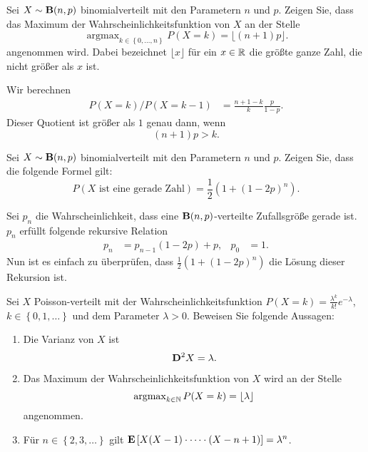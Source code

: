 Sei $X \sim \mathbf B(n,p)$ binomialverteilt mit den Parametern $n$ und $p$. Zeigen
Sie, dass das Maximum der Wahrscheinlichkeitsfunktion von $X$ an der Stelle
\begin{equation*}
    \operatorname{argmax}_{k\in \left\{ 0,\dots ,n \right\}} P(X=k) = \lfloor (n+1)p \rfloor.
\end{equation*}
angenommen wird. Dabei bezeichnet $\lfloor x \rfloor$ für ein $x\in\mathbb R$ die
größte ganze Zahl, die nicht größer als $x$ ist. 

\solution 
Wir berechnen
\begin{align*}
    P(X=k)/P(X=k-1) &= \frac{n+1-k}{k} \frac{p}{1-p}.
\end{align*}
Dieser Quotient ist größer als $1$ genau dann, wenn 
\begin{equation*}
    (n+1)p > k. 
\end{equation*}


Sei $X \sim \mathbf B(n,p)$ binomialverteilt mit den Parametern $n$ und $p$. Zeigen
Sie, dass die folgende Formel gilt:
\begin{equation*}
    P\left( X \text{ ist eine gerade Zahl} \right) = \frac{1}{2}\left( 1 + (1-2p)^n \right). 
\end{equation*}

\solution 
Sei $p_n$ die Wahrscheinlichkeit, dass eine
$\mathbf B(n,p)$-verteilte Zufallsgröße gerade ist. $p_n$ erfüllt folgende rekursive
Relation
\begin{align*}
    p_n &= p_{n-1}(1-2p) + p, &  p_0 &= 1.
\end{align*}
Nun ist es einfach zu überprüfen, dass $\frac{1}{2}(1+ (1-2p)^n)$ die Lösung
dieser Rekursion ist. 


 Sei $X$
Poisson-verteilt mit der Wahrscheinlichkeitsfunktion $P(X = k) =
\frac{\lambda^k}{k!} e^{-\lambda}$, $k\in \left\{ 0,1,\dots \right\}$ und dem
Parameter $\lambda>0$. Beweisen Sie folgende Aussagen: 
\begin{enumerate}
    \item Die Varianz von $X$ ist 
        \begin{equation*}
            \mathbf D^2 X = \lambda.
        \end{equation*}
    \item  Das Maximum der Wahrscheinlichkeitsfunktion von $X$ wird an der Stelle
        \begin{equation*}
            \operatorname{argmax}_{k\in \mathbb N} P(X= k) = \lfloor \lambda \rfloor 
        \end{equation*}
        angenommen.

    \item Für $n\in \left\{ 2,3,\dots  \right\}$ gilt 
        $\mathbf E \left[ X(X-1)\cdot\dots\cdot (X-n+1) \right] = \lambda^n$.
\end{enumerate}

